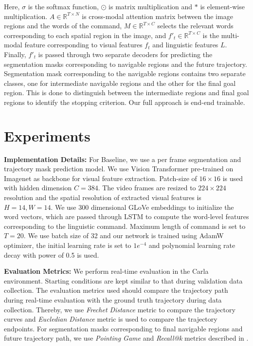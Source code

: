 \documentclass[letterpaper, 10 pt, conference]{ieeeconf}  %
\begin{document}
Here, $\sigma$ is the softmax function, $\odot$ is matrix multiplication and $\ast$ is element-wise multiplication. $A \in \mathbb R^{T \times N}$ is cross-modal attention matrix between the image regions and the words of the command, $M \in \mathbb R^{T \times C}$ selects the relevant words corresponding to each spatial region in the image, and $f'_t \in \mathbb R^{T \times C}$ is the multi-modal feature corresponding to visual features $f_t$ and linguistic features $L$. Finally, $f'_t$ is passed through two separate decoders for predicting the segmentation masks corresponding to navigable regions and the future trajectory. Segmentation mask corresponding to the navigable regions contains two separate classes, one for intermediate navigable regions and the other for the final goal region. This is done to distinguish between the intermediate regions and final goal regions to identify the stopping criterion. Our full approach is end-end trainable.

\section{Experiments}

\textbf{Implementation Details:} For Baseline, we use a per frame segmentation and trajectory mask prediction model. We use Vision Transformer \cite{dosovitskiy2020vit} pre-trained on Imagenet as backbone for visual feature extraction. Patch-size of $16 \times 16$ is used with hidden dimension $C=384$. The video frames are resized to $224 \times 224$ resolution and the spatial resolution of extracted visual features is $H=14, W=14$. We use 300 dimensional GLoVe embeddings to initialize the word vectors, which are passed through LSTM to compute the word-level features corresponding to the linguistic command. Maximum length of command is set to $T=20$. We use batch size of 32 and our network is trained using AdamW optimizer, the initial learning rate is set to $1e^{-4}$ and polynomial learning rate decay with power of 0.5 is used.


\textbf{Evaluation Metrics:} We perform real-time evaluation in the Carla environment. Starting conditions are kept similar to that during validation data collection. The evaluation metrics used should compare the trajectory path during real-time evaluation with the ground truth trajectory during data collection. Thereby, we use \emph{Frechet Distance} metric to compare the trajectory curves and \emph{Eucledian Distance} metric is used to compare the trajectory endpoints. For segmentation masks corresponding to final navigable regions and future trajectory path, we use \emph{Pointing Game} and \emph{Recall@k} metrics described in \cite{rufus2021grounding}. 
\end{document}
